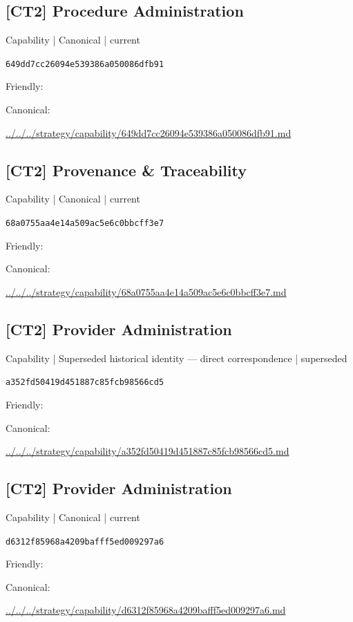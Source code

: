\documentclass[10pt,a4paper]{article}
\begin{document}
\subsection*{[CT2] Procedure Administration}
{\small Capability | Canonical | current}\par
\texttt{649dd7cc26094e539386a050086dfb91}\par
Friendly: \par
Canonical: \par
{\footnotesize\url{../../../strategy/capability/649dd7cc26094e539386a050086dfb91.md}}\par
\subsection*{[CT2] Provenance \& Traceability}
{\small Capability | Canonical | current}\par
\texttt{68a0755aa4e14a509ac5e6c0bbcff3e7}\par
Friendly: \par
Canonical: \par
{\footnotesize\url{../../../strategy/capability/68a0755aa4e14a509ac5e6c0bbcff3e7.md}}\par
\subsection*{[CT2] Provider Administration}
{\small Capability | Superseded historical identity — direct correspondence | superseded}\par
\texttt{a352fd50419d451887c85fcb98566cd5}\par
Friendly: \par
Canonical: \par
{\footnotesize\url{../../../strategy/capability/a352fd50419d451887c85fcb98566cd5.md}}\par
\subsection*{[CT2] Provider Administration}
{\small Capability | Canonical | current}\par
\texttt{d6312f85968a4209bafff5ed009297a6}\par
Friendly: \par
Canonical: \par
{\footnotesize\url{../../../strategy/capability/d6312f85968a4209bafff5ed009297a6.md}}\par
\end{document}
